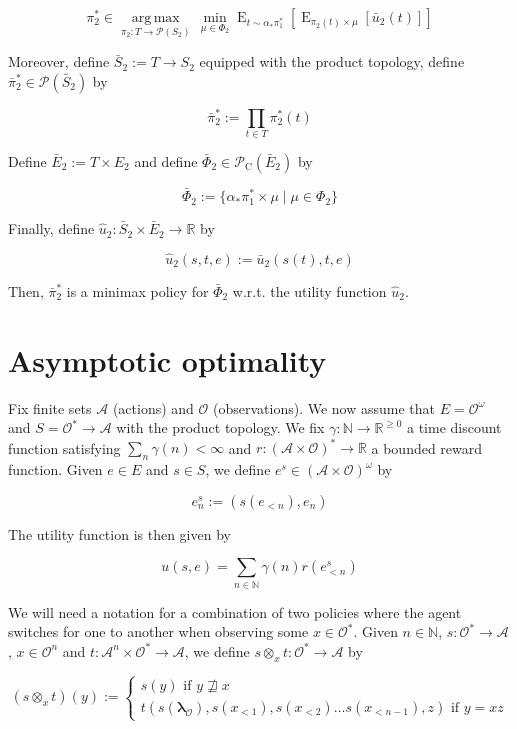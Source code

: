\documentclass[a4paper]{article}
\DeclareMathOperator{\E}{E}
\newcommand{\Argmax}[1]{\underset{#1}{\operatorname{arg\,max}}\,}
\newcommand{\Nats}{\mathbb{N}}
\newcommand{\Reals}{\mathbb{R}}
\newcommand{\Estr}{\bm{\lambda}}
\newcommand{\Prob}{\mathcal{P}}
\newcommand{\Act}{\mathcal{A}}
\newcommand{\Obs}{\mathcal{O}}
\newcommand{\ObsO}{\Obs^\omega}
\newcommand{\Pol}{\Obs^* \rightarrow \Act}
\newcommand{\CC}{\mathcal{P}_{\operatorname{C}}}
\begin{document}
$$\pi_2^* \in \Argmax{\pi_2: T \rightarrow \Prob(S_2)} \min_{\mu \in \Phi_2} \E_{t \sim \alpha_*\pi_1^*}[\E_{\pi_2(t) \times \mu}[\bar{u}_2(t)]]$$

Moreover, define ${\bar{S}_2:=T \rightarrow S_2}$ equipped with the product topology, define ${\bar{\pi}_2^* \in \Prob(\bar{S}_2)}$ by

$${\bar{\pi}_2^* := \prod_{t \in T} \pi_2^*(t)}$$

Define ${\bar{E}_2:=T \times E_2}$ and define ${\bar{\Phi}_2 \in \CC(\bar{E}_2)}$ by

$$\bar{\Phi}_2:=\{\alpha_* \pi_1^* \times \mu \mid \mu \in \Phi_2\}$$

Finally, define ${\hat{u}_2: \bar{S}_2 \times \bar{E}_2 \rightarrow \Reals}$ by

$$\hat{u}_2(s,t,e):=\bar{u}_2(s(t),t,e)$$

Then, ${\bar{\pi}_2^*}$ is a minimax policy for ${\bar{\Phi}_2}$ w.r.t. the utility function ${\hat{u}_2}$.

\section{Asymptotic optimality}

Fix finite sets ${\Act}$ (actions) and ${\Obs}$ (observations). We now assume that ${E=\ObsO}$ and ${S=\Pol}$ with the product topology. We fix ${\gamma: \Nats \rightarrow \Reals^{\geq 0}}$ a time discount function satisfying ${\sum_n \gamma(n) < \infty}$ and ${r: (\Act \times \Obs)^* \rightarrow \Reals}$ a bounded reward function. Given ${e \in E}$ and ${s \in S}$, we define ${e^s \in (\Act \times \Obs)^\omega}$ by

$${e^s_n:=(s(e_{<n}),e_n)}$$

The utility function is then given by

$$u(s,e)=\sum_{n \in \Nats} \gamma(n) r(e^s_{<n})$$

We will need a notation for a combination of two policies where the agent switches for one to another when observing some ${x \in \Obs^*}$. Given ${n \in \Nats}$, ${s: \Pol}$, ${x \in \Obs^n}$ and ${t: \Act^n \times \Pol}$, we define ${s \otimes_x t: \Pol}$ by

$$(s \otimes_x t)(y):=\begin{cases}s(y) \text{ if } y \not\sqsupseteq x \\t(s(\Estr_\Obs),s(x_{<1}), s(x_{<2}) \ldots s(x_{<{n-1}}),z) \text{ if } y=xz\end{cases}$$
\end{document}
